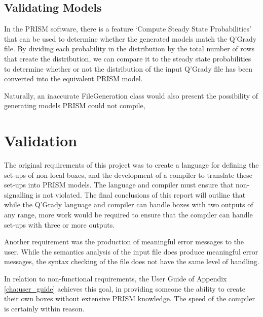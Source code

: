 \documentclass[report.tex]{subfiles}
\begin{document}
\subsection{Validating Models} %
\label{sub:validating_models}
In the PRISM software, there is a feature `Compute Steady State Probabilities'
that can be used to determine whether the generated models match the Q'Grady
file. By dividing each probability in the distribution by the total number of
rows that create the distribution, we can compare it to the steady state
probabilities to determine whether or not the distribution of the input Q'Grady
file has been converted into the equivalent PRISM model.

Naturally, an inaccurate FileGeneration class would also present the
possibility of generating models PRISM could not compile, 

\section{Validation} %
\label{sec:validation}
The original requirements of this project was to create a language for defining
the set-ups of non-local boxes, and the development of a compiler to translate
these set-ups into PRISM models. The language and compiler must ensure that
non-signalling is not violated. The final conclusions of this report will
outline that while the Q'Grady language and compiler can handle boxes with two
outputs of any range, more work would be required to ensure that the compiler
can handle set-ups with three or more outputs.

Another requirement was the production of meaningful error messages to the user.
While the semantics analysis of the input file does produce meaningful error
messages, the syntax checking of the file does not have the same level of
handling.

In relation to non-functional requirements, the User Guide of Appendix
\ref{cha:user_guide} achieves this goal, in providing someone the ability to
create their own boxes without extensive PRISM knowledge. The speed of the
compiler is certainly within reason.
\newpage
\end{document}
